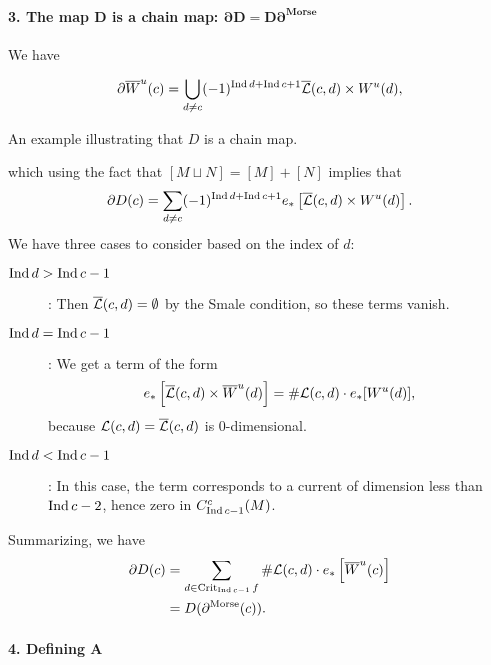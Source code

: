 \begin{myproof}
    \paragraph{3. The map $\bm{D}$ is a chain map:  $\bm{\partial D = D \partial^{\text{Morse}}}$}
    We have

    \[
        \partial \overline{W}^u(c) = \bigcup_{d \neq c}  (-1)^{\operatorname{Ind} d + \operatorname{Ind} c + 1} \overline{\mathcal L}(c, d) \times  W^u(d),
    \]
    \begin{marginfigure}
        \centering
        \caption{An example illustrating that $D$ is a chain map.}
        \label{fig:d-is-a-chain-map}
    \end{marginfigure}
    which using the fact that $[M \sqcup N] = [M] + [N]$ implies that
    \[
        \partial D(c) = \sum_{d \neq c} (-1)^{\operatorname{Ind} d + \operatorname{Ind} c + 1} e_*\left[\overline{\mathcal L}(c, d) \times  W^u(d)\right]
    .\] 
    We have three cases to consider based on the index of $d$:
    \begin{description}
        \item[$\operatorname{Ind} d > \operatorname{Ind} c-1$]: Then $\overline{\mathcal L}(c, d) = \emptyset$ by the Smale condition, so these terms vanish.
        \item[$\operatorname{Ind} d = \operatorname{Ind} c-1$]: We get a term of the form \[
            e_* \left[\overline{\mathcal L}(c, d) \times \overline{W}^u(d)\right] = \# \mathcal L(c, d) \cdot e_*[W^u(d)],\]
            because $\mathcal L(c, d) = \overline{\mathcal L}(c, d)$ is  $0$-dimensional.
        \item[$\operatorname{Ind} d < \operatorname{Ind} c-1$]: In this case, the term corresponds to a current of dimension less than $\operatorname{Ind} c - 2$, hence zero in $C_{\operatorname{Ind} c - 1}^{c}(M)$.
    \end{description}
    Summarizing, we have
    \begin{align*}
        \partial D(c) &= \sum_{d \in \operatorname{Crit}_{\operatorname{Ind} c - 1} f} \# \mathcal L(c, d) \cdot e_* \left[ \overline{W}^u(c) \right] \\
                      &= D(\partial^{\text{Morse}}(c))
    .\end{align*} 

    \paragraph{4. Defining $\bm{A}$}


\end{myproof}
